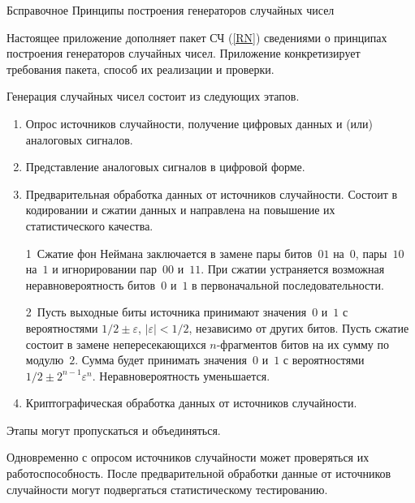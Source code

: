 \begin{appendix}{Б}{справочное}
{Принципы построения генераторов случайных чисел}
\label{RNG} 

\label{RNG.Intro}

Настоящее приложение дополняет пакет СЧ (\ref{RN})
сведениями о принципах построения генераторов случайных чисел. 
%
Приложение конкретизирует требования пакета, способ их реализации и проверки.

\label{RNG.Design}

Генерация случайных чисел состоит из следующих этапов.

\begin{enumerate}
\item
Опрос источников случайности,
получение цифровых данных и (или) аналоговых сигналов.

\item
Представление аналоговых сигналов в цифровой форме.

\item
Предварительная обработка данных от источников случайности. 
Состоит в кодировании и сжатии данных и направлена на повышение их 
статистического качества. 

\begin{examples}
1~Сжатие фон Неймана заключается в замене пары битов~$01$ на~$0$, 
пары~$10$ на~$1$ и игнорировании пар~$00$ и~$11$. При сжатии устраняется 
возможная неравновероятность битов~$0$ и~$1$ в первоначальной 
последовательности.

2~Пусть выходные биты источника принимают значения~$0$ и~$1$ с 
вероятностями $1/2\pm\varepsilon$, $|\varepsilon|<1/2$, независимо от других 
битов.
%
Пусть сжатие состоит в замене непересекающихся $n$-фрагментов битов на их сумму 
по модулю~$2$. 
%
Сумма будет принимать значения~$0$ и~$1$ с вероятностями
$1/2\pm 2^{n-1}\varepsilon^n$. Неравновероятность уменьшается.
\end{examples}

\item
Криптографическая обработка данных от источников случайности. 
\end{enumerate}

Этапы могут пропускаться и объединяться. 

Одновременно с опросом источников случайности может проверяться их 
работоспособность.
%
После предварительной обработки данные от источников случайности 
могут подвергаться статистическому тестированию. 


\end{appendix}
